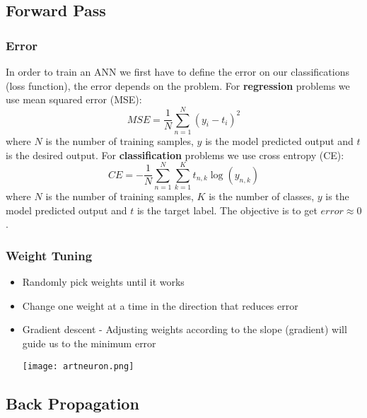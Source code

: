 \documentclass[11pt]{article}
\begin{document}
\subsection{Forward Pass}
\subsubsection{Error}
In order to train an ANN we first have to define the error on our classifications (loss function),  the error depends on the problem.  For \textbf{regression} problems we use mean squared error (MSE):
$$ MSE = \frac{1}{N} \sum_{n=1}^N (y_i - t_i)^2 $$
where $N$ is the number of training samples, $y$ is the model predicted output and $t$ is the desired output. For \textbf{classification} problems we use cross entropy (CE):
$$ CE = -\frac{1}{N} \sum_{n=1}^N \sum_{k=1}^K t_{n,k} \log (y_{n,k}) $$ 
where $N$ is the number of training samples, $K$ is the number of classes, $y$ is the model predicted output and $t$ is the target label. The objective is to get $error \approx 0$.
\subsubsection{Weight Tuning}
\begin{itemize}
\item Randomly pick weights until it works 
\item Change one weight at a time in the direction that reduces error
\item Gradient descent - Adjusting weights according to the slope (gradient) will guide us to the minimum error
\begin{center}
\texttt{[image: artneuron.png]}
\end{center}
\end{itemize}


\subsection{Back Propagation}
\end{document}
